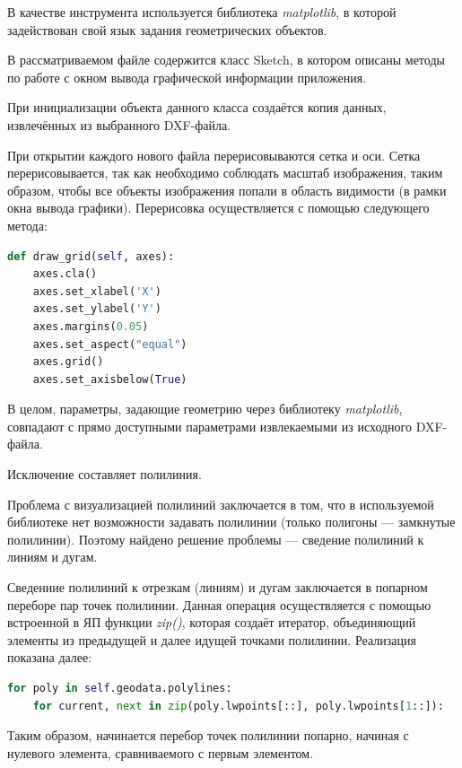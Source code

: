 В качестве инструмента используется библиотека \textit{matplotlib}, в которой задействован свой язык задания геометрических объектов.

В рассматриваемом файле содержится класс Sketch, в котором описаны методы по работе с окном вывода графической информации приложения.

При инициализации объекта данного класса создаётся копия данных, извлечённых из выбранного DXF-файла.

При открытии каждого нового файла перерисовываются сетка и оси. Сетка перерисовывается, так как необходимо соблюдать масштаб изображения, таким образом, чтобы все объекты изображения попали в область видимости (в рамки окна вывода графики). Перерисовка осуществляется с помощью следующего метода:
\begin{lstlisting}[language=python,label=list:redraw]
def draw_grid(self, axes):
	axes.cla()
	axes.set_xlabel('X')
	axes.set_ylabel('Y')
	axes.margins(0.05)
	axes.set_aspect("equal")
	axes.grid()
	axes.set_axisbelow(True)
\end{lstlisting}

В целом, параметры, задающие геометрию через библиотеку \textit{matplotlib}, совпадают с прямо доступными параметрами извлекаемыми из исходного DXF-файла.

Исключение составляет полилиния.

Проблема с визуализацией полилиний заключается в том, что в используемой библиотеке нет возможности задавать полилинии (только полигоны --- замкнутые полилинии). Поэтому найдено решение проблемы --- сведение полилиний к линиям и дугам.

Сведениие полилиний к отрезкам (линиям) и дугам заключается в попарном переборе пар точек полилинии. Данная операция осуществляется с помощью встроенной в ЯП функции \textit{zip()}, которая создаёт итератор, объединяющий элементы из предыдущей и далее идущей точками полилинии. Реализация показана далее:
\begin{lstlisting}[language=python,label=list:redraw]
for poly in self.geodata.polylines:
	for current, next in zip(poly.lwpoints[::], poly.lwpoints[1::]):
\end{lstlisting}

Таким образом, начинается перебор точек полилинии попарно, начиная с нулевого элемента, сравниваемого с первым элементом.

